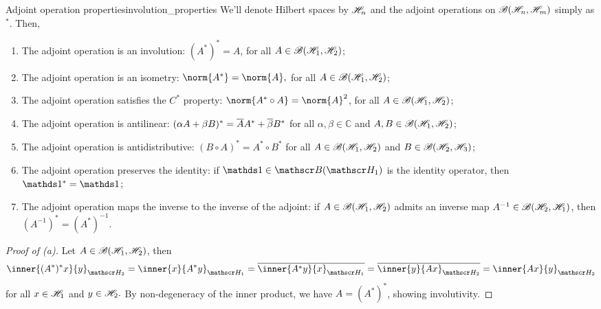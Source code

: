 \begin{theorem}{Adjoint operation properties}{involution_properties}
    We'll denote Hilbert spaces by \(\mathscr{H}_n\) and the adjoint operations on \(\mathscr{B}(\mathscr{H}_n, \mathscr{H}_m)\) simply as \(^*\). Then,
    \begin{enumerate}[label=(\alph*)]
        \item The adjoint operation is an involution: \((A^*)^* = A\), for all \(A \in \mathscr{B}(\mathscr{H}_1, \mathscr{H}_2)\);
        \item The adjoint operation is an isometry: \(\norm{A^*} = \norm{A},\) for all \(A \in \mathscr{B}(\mathscr{H}_1, \mathscr{H}_2)\);
        \item The adjoint operation satisfies the \(C^*\) property: \(\norm{A^* \circ A} = \norm{A}^2\), for all \(A \in \mathscr{B}(\mathscr{H}_1, \mathscr{H}_2)\);
        \item The adjoint operation is antilinear: \((\alpha A + \beta B)^* = \overline{A} A^* + \overline{\beta} B^*\) for all \(\alpha, \beta \in \mathbb{C}\) and \(A, B \in \mathscr{B}(\mathscr{H}_1, \mathscr{H}_2)\);
        \item The adjoint operation is antidistributive: \((B \circ A)^* = A^*\circ B^*\) for all \(A \in \mathscr{B}(\mathscr{H}_1, \mathscr{H}_2)\) and \(B \in \mathscr{B}(\mathscr{H}_2, \mathscr{H}_3)\);
        \item The adjoint operation preserves the identity: if \(\unity \in \bounded(\hilbert_1)\) is the identity operator, then \(\unity^* = \unity\);
        \item The adjoint operation maps the inverse to the inverse of the adjoint: if \(A \in \mathscr{B}(\mathscr{H}_1, \mathscr{H}_2)\) admits an inverse map \(A^{-1} \in \mathscr{B}(\mathscr{H}_2, \mathscr{H}_1)\), then \((A^{-1})^* = (A^*)^{-1}\).
    \end{enumerate}
\end{theorem}
\begin{proof}[Proof of (a)]
    Let \(A \in \mathscr{B}(\mathscr{H}_1, \mathscr{H}_2)\), then
    \begin{equation*}
        \inner{(A^*)^*x}{y}_{\hilbert_2} = \inner{x}{A^*y}_{\hilbert_1} = \conj{\inner{A^*y}{x}_{\hilbert_1}} = \conj{\inner{y}{Ax}_{\hilbert_2}} = \inner{Ax}{y}_{\hilbert_2}
    \end{equation*}
    for all \(x \in \mathscr{H}_1\) and \(y \in \mathscr{H}_2.\) By non-degeneracy of the inner product, we have \(A = (A^*)^*\), showing involutivity.
\end{proof}
